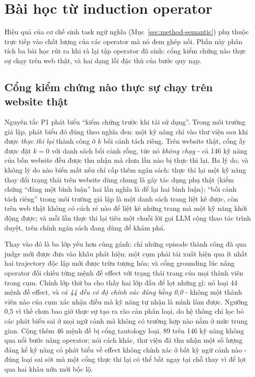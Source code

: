 \section{Bài học từ induction operator}
\label{sec:disc-operators}

Hiệu quả của cơ chế sinh task ngữ nghĩa (Mục~\ref{sec:method-semantic}) phụ
thuộc trực tiếp vào chất lượng của các operator mà nó đem ghép nối. Phần này
phân tích ba bài học rút ra khi rà lại tập operator đã sinh: cổng kiểm chứng
nào thực sự chạy trên web thật, và hai dạng lỗi đặc thù của bước quy nạp.

\subsection{Cổng kiểm chứng nào thực sự chạy trên website thật}
\label{sec:disc-verify}

Nguyên tắc P1 phát biểu ``kiểm chứng trước khi tái sử dụng''. Trong môi trường
giả lập, phát biểu đó đúng theo nghĩa đen: một kỹ năng chỉ vào thư viện sau khi
được \emph{thực thi lại} thành công ở $k$ bối cảnh tách riêng. Trên website
thật, cổng ấy được đặt $k = 0$ với danh sách bối cảnh rỗng, tức nó \emph{không
chạy} - cả 146 kỹ năng của bốn website đều được thu nhận mà chưa lần nào bị
thực thi lại. Ba lý do, và không lý do nào biến mất nếu chỉ cấp thêm ngân sách:
thực thi lại một kỹ năng thay đổi trạng thái trên website dùng chung là gây tác
dụng phụ thật (kiểm chứng ``đăng một bình luận'' hai lần nghĩa là để lại hai
bình luận); ``bối cảnh tách riêng'' trong môi trường giả lập là một danh sách
trang liệt kê được, còn trên web thật không có cách rẻ nào để liệt kê những
trang mà một kỹ năng khởi động được; và mỗi lần thực thi lại tiêu một chuỗi lời
gọi LLM cộng thao tác trình duyệt, trên chính ngân sách đang dùng để khám phá.

Thay vào đó là ba lớp yếu hơn cùng gánh: chỉ những episode thành công đã qua
judge mới được đưa vào khâu phát hiện; một cụm phải tái xuất hiện qua ít nhất
hai trajectory độc lập mới được trừu tượng hóa; và cổng grounding lúc nâng
operator đối chiếu từng mệnh đề effect với trạng thái trang của mọi thành viên
trong cụm. Chính lớp thứ ba cho thấy hai lớp đầu để lọt những gì: nó loại 44
mệnh đề effect, và \emph{cả 44 đều có độ chính xác đúng bằng 0,0} - không một
thành viên nào của cụm xác nhận điều mà kỹ năng tự nhận là mình làm được. Ngưỡng
0,5 vì thế chưa bao giờ thực sự tạo ra rào cản phân loại, do hệ thống chỉ lọc
bỏ các phát biểu sai ở mọi ngữ cảnh mà không có trường hợp nào nằm ở mức trung
gian. Cộng thêm 46 mệnh đề bị cổng tautology loại, 89 trên 146 kỹ năng không
qua nổi bước nâng operator; nói cách khác, thư viện đã thu nhận một số lượng
đáng kể kỹ năng có phát biểu về effect không chính xác ở bất kỳ ngữ cảnh nào -
đúng loại sai sót mà một cổng thực thi lại có thể bắt ngay tại chỗ thay vì để
lọt qua hai khâu nữa mới bộc lộ.

